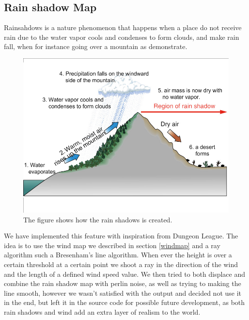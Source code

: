 \subsection{Rain shadow Map}
\label{rainshadowmap}

Rainsahdows is a nature phenomenon that happens when a place do not receive rain due to the water vapor cools and condenses to form clouds, and make rain fall, when for instance going over a mountain as  demonstrate.

\begin{figure}[H]
	\includegraphics[width=1\linewidth]{img/Rainshadow}
	\centering
	\caption{The figure shows how the rain shadows is created.}
	\label{fig:Rainshadow}
\end{figure}

We have implemented this feature with inspiration from Dungeon League\cite{RainShadowMap}. The idea is to use the wind map we described in section \ref{windmap} and a ray algorithm such a Bresenham's line algorithm\cite{Bresenham}. When ever the height is over a certain threshold at a certain point we shoot a ray in the direction of the wind and the length of a defined wind speed value. We then tried to both displace and combine the rain shadow map with perlin noise, as well as trying to making the line smooth, however we wasn't satisfied with the output and decided not use it in the end, but left it in the source code for possible future development, as both rain shadows and wind add an extra layer of realism to the world.